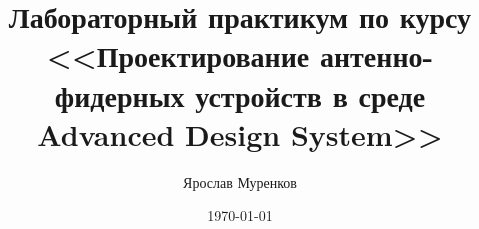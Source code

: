 \documentclass[a4paper,12pt]{report}
\author{Ярослав Муренков}
\title{Лабораторный практикум по курсу <<Проектирование антенно-фидерных устройств в среде Advanced Design System>>}
\date{\today}
\begin{document}
\tableofcontents{}








\end{document}
